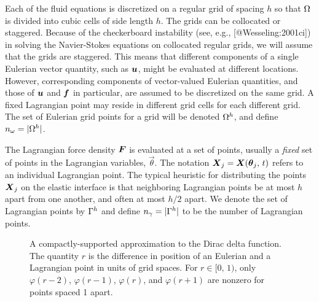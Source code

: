 Each of the fluid equations is discretized on a regular grid of spacing $h$ so
that $\Omega$ is divided into cubic cells of side length $h$. The grids can be
collocated or staggered. Because of the checkerboard instability (see, e.g.,
[@Wesseling:2001ci]) in solving the Navier-Stokes equations on collocated
regular grids, we will assume that the grids are staggered. This means that
different components of a single Eulerian vector quantity, such as $\boldsymbol{u}$,
might be evaluated at different locations. However, corresponding components of
vector-valued Eulerian quantities, and those of $\boldsymbol{u}$ and $\boldsymbol{f}$ in
particular, are assumed to be discretized on the same grid. A fixed Lagrangian
point may reside in different grid cells for each different grid. The set of
Eulerian grid points for a grid will be denoted $\Omega^h$, and define
$n_\omega = |\Omega^h|$.

The Lagrangian force density $\boldsymbol{F}$ is evaluated at a set of points, usually a
\emph{fixed} set of points in the Lagrangian variables, $\vec{\theta}$. The
notation $\boldsymbol{X}_j=\boldsymbol{X}(\boldsymbol{\theta}_j,\,t)$ refers to an individual Lagrangian point. The
typical heuristic for distributing the points $\boldsymbol{X}_j$ on the elastic interface
is that neighboring Lagrangian points be at most $h$ apart from one another,
and often at most $h/2$ apart. We denote the set of Lagrangian points by
$\Gamma^h$ and define $n_\gamma = |\Gamma^h|$ to be the number of
Lagrangian points.

\begin{figure}[thb]
    \centering
    \caption{%
        A compactly-supported approximation to the Dirac delta function. The
        quantity $r$ is the difference in position of an Eulerian and
        a Lagrangian point in units of grid spaces. For $r\in[0,\,1)$, only
        $\varphi(r-2)$, $\varphi(r-1)$, $\varphi(r)$, and $\varphi(r+1)$ are
        nonzero for points spaced 1 apart.
    }
    \label{fig:1d-kernel}
\end{figure}

